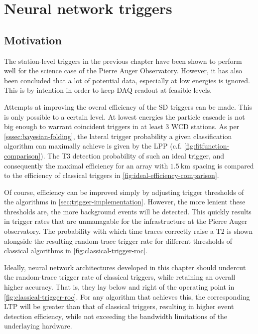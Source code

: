 
\chapter{Neural network triggers}
\label{chap:neural-network-triggers}

\section{Motivation}
\label{sec:motivation}

The station-level triggers in the previous chapter have been shown to perform well for the science case of the Pierre Auger Observatory. However, it has 
also been concluded that a lot of potential data, especially at low energies is ignored. This is by intention in order to keep DAQ readout at feasible levels.

Attempts at improving the overal efficiency of the SD triggers can be made. This is only possible to a certain level. At lowest energies the particle cascade is 
not big enough to warrant coincident triggers in at least 3 WCD stations. As per \autoref{sssec:bayesian-folding}, the lateral trigger probability a given 
classification algorithm can maximally achieve is given by the LPP (c.f. \autoref{fig:fitfunction-comparison}). The T3 detection probability of such an ideal 
trigger, and consequently the maximal efficiency for an array with $\SI{1.5}{\kilo\meter}$ spacing is compared to the efficiency of classical triggers in 
\autoref{fig:ideal-efficiency-comparison}.

Of course, efficiency can be improved simply by adjusting trigger thresholds of the algorithms in \autoref{sec:trigger-implementation}. However, the more lenient
these thresholds are, the more background events will be detected. This quickly results in trigger rates that are unmanagable for the infrastructure at the Pierre 
Auger observatory. The probability with which time traces correctly raise a T2 is shown alongside the resulting random-trace trigger rate for different thresholds
of classical algorithms in \autoref{fig:classical-trigger-roc}.

Ideally, neural network architectures developed in this chapter should undercut the random-trace trigger rate of classical triggers, while retaining an overall 
higher accuracy. That is, they lay below and right of the operating point in \autoref{fig:classical-trigger-roc}. For any algorithm that achieves this, the 
corresponding LTP will be greater than that of classical triggers, resulting in higher event detection efficiency, while not exceeding the bandwidth limitations 
of the underlaying hardware. 

